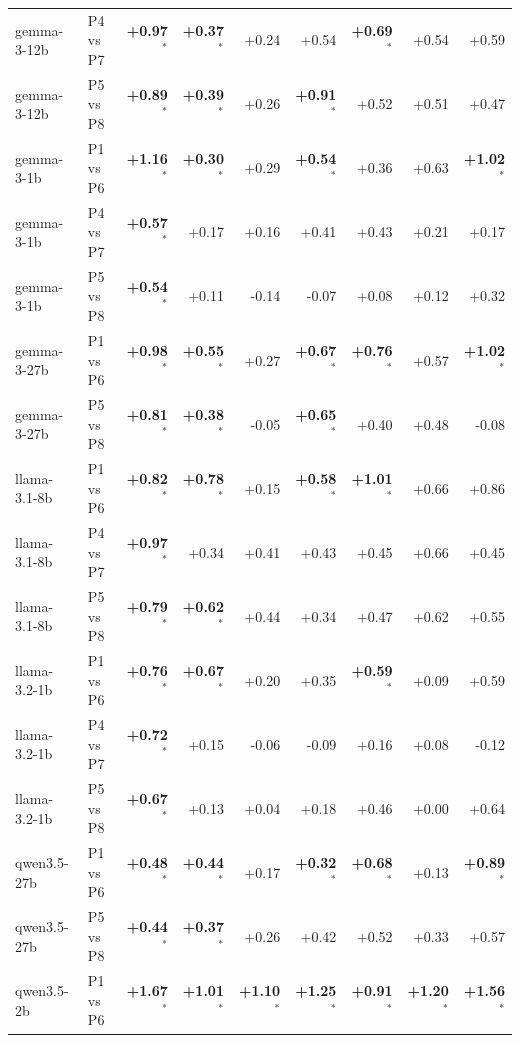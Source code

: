 \begin{table}[p]
\begin{tabular}{llrrrrrrr}
gemma-3-12b & P4 vs P7 & \textbf{+0.97$^{*}$} & \textbf{+0.37$^{*}$} & +0.24 & +0.54 & \textbf{+0.69$^{*}$} & +0.54 & +0.59 \\
gemma-3-12b & P5 vs P8 & \textbf{+0.89$^{*}$} & \textbf{+0.39$^{*}$} & +0.26 & \textbf{+0.91$^{*}$} & +0.52 & +0.51 & +0.47 \\
gemma-3-1b & P1 vs P6 & \textbf{+1.16$^{*}$} & \textbf{+0.30$^{*}$} & +0.29 & \textbf{+0.54$^{*}$} & +0.36 & +0.63 & \textbf{+1.02$^{*}$} \\
gemma-3-1b & P4 vs P7 & \textbf{+0.57$^{*}$} & +0.17 & +0.16 & +0.41 & +0.43 & +0.21 & +0.17 \\
gemma-3-1b & P5 vs P8 & \textbf{+0.54$^{*}$} & +0.11 & -0.14 & -0.07 & +0.08 & +0.12 & +0.32 \\
gemma-3-27b & P1 vs P6 & \textbf{+0.98$^{*}$} & \textbf{+0.55$^{*}$} & +0.27 & \textbf{+0.67$^{*}$} & \textbf{+0.76$^{*}$} & +0.57 & \textbf{+1.02$^{*}$} \\
gemma-3-27b & P5 vs P8 & \textbf{+0.81$^{*}$} & \textbf{+0.38$^{*}$} & -0.05 & \textbf{+0.65$^{*}$} & +0.40 & +0.48 & -0.08 \\
llama-3.1-8b & P1 vs P6 & \textbf{+0.82$^{*}$} & \textbf{+0.78$^{*}$} & +0.15 & \textbf{+0.58$^{*}$} & \textbf{+1.01$^{*}$} & +0.66 & +0.86 \\
llama-3.1-8b & P4 vs P7 & \textbf{+0.97$^{*}$} & +0.34 & +0.41 & +0.43 & +0.45 & +0.66 & +0.45 \\
llama-3.1-8b & P5 vs P8 & \textbf{+0.79$^{*}$} & \textbf{+0.62$^{*}$} & +0.44 & +0.34 & +0.47 & +0.62 & +0.55 \\
llama-3.2-1b & P1 vs P6 & \textbf{+0.76$^{*}$} & \textbf{+0.67$^{*}$} & +0.20 & +0.35 & \textbf{+0.59$^{*}$} & +0.09 & +0.59 \\
llama-3.2-1b & P4 vs P7 & \textbf{+0.72$^{*}$} & +0.15 & -0.06 & -0.09 & +0.16 & +0.08 & -0.12 \\
llama-3.2-1b & P5 vs P8 & \textbf{+0.67$^{*}$} & +0.13 & +0.04 & +0.18 & +0.46 & +0.00 & +0.64 \\
qwen3.5-27b & P1 vs P6 & \textbf{+0.48$^{*}$} & \textbf{+0.44$^{*}$} & +0.17 & \textbf{+0.32$^{*}$} & \textbf{+0.68$^{*}$} & +0.13 & \textbf{+0.89$^{*}$} \\
qwen3.5-27b & P5 vs P8 & \textbf{+0.44$^{*}$} & \textbf{+0.37$^{*}$} & +0.26 & +0.42 & +0.52 & +0.33 & +0.57 \\
qwen3.5-2b & P1 vs P6 & \textbf{+1.67$^{*}$} & \textbf{+1.01$^{*}$} & \textbf{+1.10$^{*}$} & \textbf{+1.25$^{*}$} & \textbf{+0.91$^{*}$} & \textbf{+1.20$^{*}$} & \textbf{+1.56$^{*}$} \\

\end{tabular}
\end{table}
